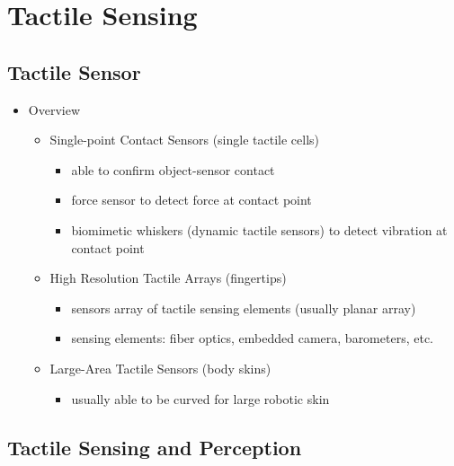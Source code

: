 \section{Tactile Sensing}
\subsection{Tactile Sensor}
\begin{itemize}
\item Overview
	\begin{itemize}
	\item Single-point Contact Sensors (single tactile cells)
		\begin{itemize}
		\item able to confirm object-sensor contact
		\item force sensor to detect force at contact point
		\item biomimetic whiskers (dynamic tactile sensors) to detect vibration at contact point
		\end{itemize}
	\item High Resolution Tactile Arrays (fingertips)
		\begin{itemize}
		\item sensors array of tactile sensing elements (usually planar array)
		\item sensing elements: fiber optics, embedded camera, barometers, etc.
		\end{itemize}
	\item Large-Area Tactile Sensors (body skins)
		\begin{itemize}
		\item usually able to be curved for large robotic skin
		\end{itemize}
	\end{itemize}
\end{itemize}
\subsection{Tactile Sensing and Perception}
